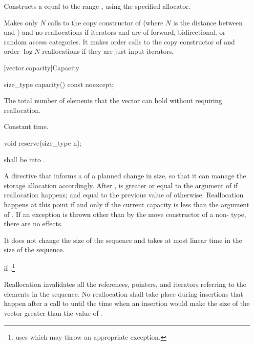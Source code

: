 \begin{itemdescr}

\pnum
\effects Constructs a  equal to the
range , using the specified allocator.

\pnum
\complexity
Makes only $N$
calls to the copy constructor of
(where $N$
is the distance between
and
)
and no reallocations if iterators  and  are of forward, bidirectional, or random access categories.
It makes order
calls to the copy constructor of
and order
$\log N$
reallocations if they are just input iterators.
\end{itemdescr}

[vector.capacity]{Capacity}

%
\begin{itemdecl}
size_type capacity() const noexcept;
\end{itemdecl}

\begin{itemdescr}
\pnum
\returns
The total number of elements that the vector can hold
without requiring reallocation.

\pnum
\complexity Constant time.
\end{itemdescr}

%
\begin{itemdecl}
void reserve(size_type n);
\end{itemdecl}

\begin{itemdescr}
\pnum
\requires {} shall be  into .

\pnum
\effects
A directive that informs a
of a planned change in size, so that it can manage the storage allocation accordingly.
After
,
is greater or equal to the argument of
if reallocation happens; and equal to the previous value of
otherwise.
Reallocation happens at this point if and only if the current capacity is less than the
argument of
. If an exception is thrown
other than by the move constructor of a non- type,
there are no effects.

\pnum
\complexity
It does not change the size of the sequence and takes at most linear
time in the size of the sequence.

\pnum
\throws
{} if .\footnote{ uses  which
may throw an appropriate exception.}

\pnum
\remarks
Reallocation invalidates all the references, pointers, and iterators
referring to the elements in the sequence.
No reallocation shall take place during insertions that happen
after a call to
until the time when an insertion would make the size of the vector
greater than the value of
.
\end{itemdescr}

